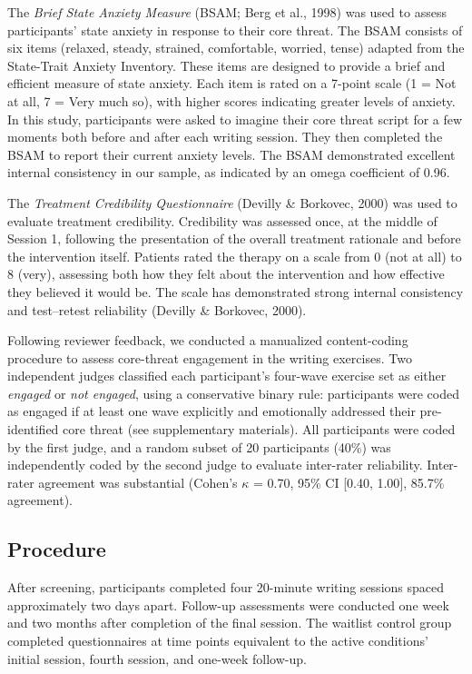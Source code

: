 \documentclass[
  man,floatsintext]{apa7}
\begin{document}
The \emph{Brief State Anxiety Measure} (BSAM; Berg et al., 1998) was used to assess participants' state anxiety in response to their core threat.
The BSAM consists of six items (relaxed, steady, strained, comfortable, worried, tense) adapted from the State-Trait Anxiety Inventory.
These items are designed to provide a brief and efficient measure of state anxiety.
Each item is rated on a 7-point scale (1 = Not at all, 7 = Very much so), with higher scores indicating greater levels of anxiety.
In this study, participants were asked to imagine their core threat script for a few moments both before and after each writing session.
They then completed the BSAM to report their current anxiety levels.
The BSAM demonstrated excellent internal consistency in our sample, as indicated by an omega coefficient of 0.96.

The \emph{Treatment Credibility Questionnaire} (Devilly \& Borkovec, 2000) was used to evaluate treatment credibility.
Credibility was assessed once, at the middle of Session 1, following the presentation of the overall treatment rationale and before the intervention itself.
Patients rated the therapy on a scale from 0 (not at all) to 8 (very), assessing both how they felt about the intervention and how effective they believed it would be.
The scale has demonstrated strong internal consistency and test--retest reliability (Devilly \& Borkovec, 2000).

Following reviewer feedback, we conducted a manualized content-coding procedure to assess core-threat engagement in the writing exercises.
Two independent judges classified each participant's four-wave exercise set as either \emph{engaged} or \emph{not engaged}, using a conservative binary rule: participants were coded as engaged if at least one wave explicitly and emotionally addressed their pre-identified core threat (see supplementary materials).
All participants were coded by the first judge, and a random subset of 20 participants (40\%) was independently coded by the second judge to evaluate inter-rater reliability.
Inter-rater agreement was substantial (Cohen's \(\kappa\) = 0.70, 95\% CI {[}0.40, 1.00{]}, 85.7\% agreement).

\subsection{Procedure}\label{procedure}

After screening, participants completed four 20-minute writing sessions spaced approximately two days apart.
Follow-up assessments were conducted one week and two months after completion of the final session.
The waitlist control group completed questionnaires at time points equivalent to the active conditions' initial session, fourth session, and one-week follow-up.
\end{document}
